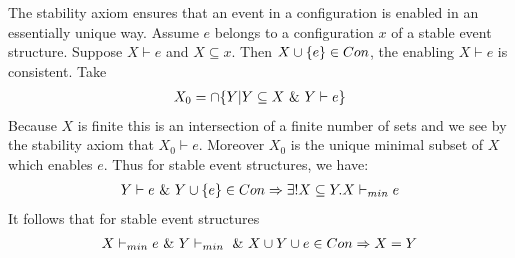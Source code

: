 The stability axiom ensures that an event in a configuration is
enabled in an essentially unique way.
Assume $e$ belongs to a configuration $x$ of a stable event structure.
Suppose $X \vdash e$ and $X \subseteq x$.
Then $X \cup \{e\} \in Con$, the enabling $X\vdash e$ is consistent.
Take
\begin{align*}
    X_0 = \cap \{Y | Y \subseteq X \ \& \  Y \vdash e\}
\end{align*}
Because $X$ is finite this is an intersection of a finite number of
sets and we see by the stability axiom that $X_0 \vdash e$.
Moreover $X_0$ is the unique minimal subset of $X$ which enables $e$.
Thus for stable event structures, we have:
\begin{align*}
    Y \vdash e \ \& \  Y \cup \{e\} \in Con \Rightarrow
    \exists ! X \subseteq Y.X \vdash_{min} e
\end{align*}
It follows that for stable event structures
\begin{align*}
    X \vdash_{min} e \ \& \  Y \vdash_{min} \ \& \ 
    X \cup Y \cup e \in Con \Rightarrow X = Y
\end{align*}

